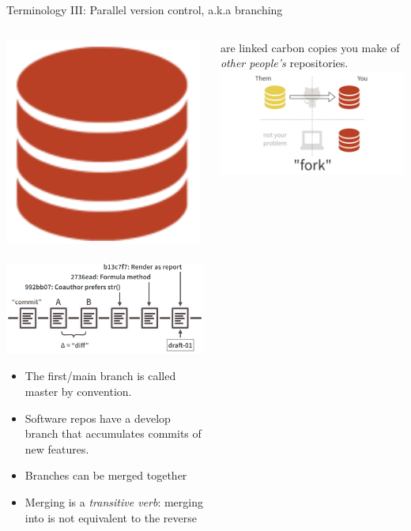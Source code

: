 \documentclass[ignorenonframetext,notes, 10pt, aspectratio=169]{beamer}
\begin{document}
\begin{frame}{Terminology III: Parallel version control, a.k.a branching}
\begin{columns}[T]
\begin{column}{0.5\textwidth}

\centering
\includegraphics[width =0.25\linewidth]{repo-0.png} \hspace{-1em}~ \includegraphics[width =0.5\linewidth]{commit-diff-sha-tag.png}

\small
\begin{itemize}
  \item The first/main branch is called \alert{master} by convention. 
  \item Software repos have a \alert{develop} branch that accumulates commits of new features.
  \item Branches can be \alert{merged} together
  \item Merging is a \emph{transitive verb}: merging  into  is not equivalent to the reverse
\end{itemize}
\end{column}


\begin{column}{0.25\textwidth}
are linked carbon copies you make of \emph{other people's} repositories.\\

\includegraphics[width = 1.25\linewidth]{fork.png}
\end{column}


\end{columns}
\end{frame}
\end{document}
